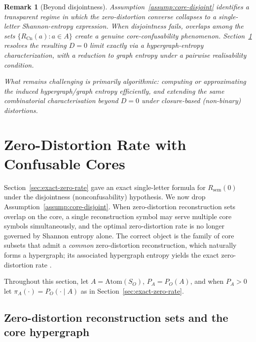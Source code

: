 \documentclass[journal,onecolumn]{IEEEtran}
\newcommand{\Atom}{\text{Atom}}
\newcommand{\Cn}{\text{Cn}}
\newtheorem{remark}{Remark}[section]
\numberwithin{equation}{section}
\begin{document}
\begin{remark}[Beyond disjointness]
\label{rem:general-confusable-case}
Assumption~\ref{assump:core-disjoint} identifies a transparent regime in which
the zero-distortion converse collapses to a single-letter Shannon-entropy
expression. When disjointness fails, overlaps among the sets
\(\{R_{\Cn}(a):a\in A\}\) create a genuine core-confusability phenomenon.
Section~\ref{sec:confusable} resolves the resulting \(D=0\) limit exactly via a
hypergraph-entropy characterization, with a reduction to graph entropy under a
pairwise realisability condition.

What remains challenging is primarily algorithmic: computing or approximating
the induced hypergraph/graph entropy efficiently, and extending the same
combinatorial characterisation beyond \(D=0\) under closure-based (non-binary)
distortions.
\end{remark}

\section{Zero-Distortion Rate with Confusable Cores}
\label{sec:confusable}

Section~\ref{sec:exact-zero-rate} gave an exact single-letter formula for
\(R_{\mathrm{sem}}(0)\) under the disjointness (nonconfusability) hypothesis.
We now drop Assumption~\ref{assump:core-disjoint}.
When zero-distortion reconstruction sets overlap on the core, a single
reconstruction symbol may serve multiple core symbols simultaneously, and
the optimal zero-distortion rate is no longer governed by Shannon entropy
alone. The correct object is the family of core subsets that admit a
\emph{common} zero-distortion reconstruction, which naturally forms a
hypergraph; its associated hypergraph entropy yields the exact
zero-distortion rate \cite{korner1971coding,alon1996source,orlitsky2001coding}.

Throughout this section, let \(A=\Atom(S_O)\), \(P_A=P_O(A)\), and when \(P_A>0\)
let \(\pi_A(\cdot)=P_O(\cdot\mid A)\) as in Section~\ref{sec:exact-zero-rate}.

\subsection{Zero-distortion reconstruction sets and the core hypergraph}
\label{subsec:confusable-hypergraph}
\end{document}
